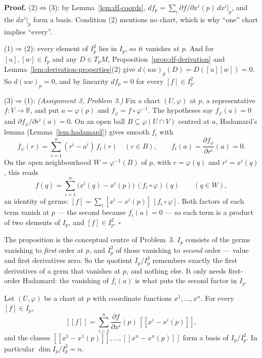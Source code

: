 \documentclass[11pt]{report}
\makeatletter
\newcounter{thmcounter}[section]
\renewenvironment{proof}[1][Proof]{\noindent\textbf{#1.} }{\hfill$\square$\par\vspace{5pt}}
\newcommand{\thmlabel}[1]{\edef\@currentlabel{\arabic{section}.\arabic{thmcounter}}\label{#1}}
\newcommand{\leeref}[1]{\par\smallskip{\raggedleft\footnotesize\textsc{Lee}:\ #1\par}}
\makeatother
\begin{document}
\begin{proof}
(2)$\iff$(3): by Lemma~\ref{lem:df-coords}, $df_p = \sum_i \partial f/\partial x^i(p)\,dx^i|_p$, and the $dx^i|_p$ form a basis. Condition (2) mentions no chart, which is why ``one'' chart implies ``every''.

(1)$\Rightarrow$(2): every element of $I_p^2$ lies in $I_p$, so it vanishes at $p$. And for $[u], [w] \in I_p$ and any $D \in T_pM$, Proposition~\ref{prop:df-derivation} and Lemma~\ref{lem:derivation-properties}(2) give $d(uw)_p(D) = D([u][w]) = 0$. So $d(uw)_p = 0$, and by linearity $df_p = 0$ for every $[f] \in I_p^2$.

(3)$\Rightarrow$(1): \textit{(Assignment 3, Problem 3.)} Fix a chart $(U,\varphi)$ at $p$, a representative $f : V \to \mathbb{R}$, and put $a = \varphi(p)$ and $f_\varphi = f \circ \varphi^{-1}$. The hypotheses say $f_\varphi(a) = 0$ and $\partial f_\varphi/\partial r^i(a) = 0$. On an open ball $B \subseteq \varphi(U \cap V)$ centred at $a$, Hadamard's lemma (Lemma~\ref{lem:hadamard}) gives smooth $f_i$ with
\[
f_\varphi(r) = \sum_{i=1}^n (r^i - a^i)\, f_i(r) \quad (r \in B), \qquad f_i(a) = \frac{\partial f_\varphi}{\partial r^i}(a) = 0 .
\]
On the open neighbourhood $W = \varphi^{-1}(B)$ of $p$, with $r = \varphi(q)$ and $r^i = x^i(q)$, this reads
\[
f(q) = \sum_{i=1}^n \big(x^i(q) - x^i(p)\big)\,(f_i \circ \varphi)(q) \qquad (q \in W),
\]
an identity of germs: $[f] = \sum_i [x^i - x^i(p)]\,[f_i \circ \varphi]$. Both factors of each term vanish at $p$ --- the second because $f_i(a) = 0$ --- so each term is a product of two elements of $I_p$, and $[f] \in I_p^2$.
\end{proof}

\begin{rembox}\label{rem:cotangent-2}
The proposition is the conceptual centre of Problem~3. $I_p$ consists of the germs vanishing to \emph{first} order at $p$, and $I_p^2$ of those vanishing to \emph{second} order --- value and first derivatives zero. So the quotient $I_p/I_p^2$ remembers exactly the first derivatives of a germ that vanishes at $p$, and nothing else. It only needs first-order Hadamard: the vanishing of $f_i(a)$ is what puts the second factor in $I_p$.
\end{rembox}

\begin{propbox}[A Basis of $I_p/I_p^2$]\thmlabel{prop:ideal-basis}
Let $(U, \varphi)$ be a chart at $p$ with coordinate functions $x^1, \ldots, x^n$. For every $[f] \in I_p$,
\[
[[f]] = \sum_{i=1}^n \frac{\partial f}{\partial x^i}(p)\, [[x^i - x^i(p)]],
\]
and the classes $[[x^1 - x^1(p)]], \ldots, [[x^n - x^n(p)]]$ form a basis of $I_p/I_p^2$. In particular $\dim I_p/I_p^2 = n$.
\leeref{cf.\ Problem 11-4(a)}
\end{propbox}
\end{document}
